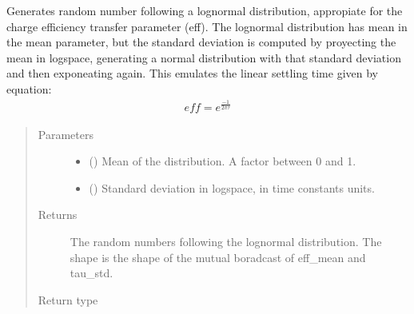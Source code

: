 \documentclass[letterpaper,10pt,english]{sphinxmanual}
\begin{document}

\begin{fulllineitems}
\label{\detokenize{gen:calib.gen.eff_random}}
Generates random number following a lognormal distribution, appropiate for
the charge efficiency transfer parameter (eff). The lognormal distribution
has mean in the mean parameter, but the standard deviation is computed by
proyecting the mean in logspace, generating a normal distribution with that
standard deviation and then exponeating again. This emulates the linear
settling time given by equation:
\begin{equation*}
\begin{split}\mathit{eff} = e^{\frac{-1}{2 \pi \tau}}\end{split}
\end{equation*}\begin{quote}\begin{description}
\item[{Parameters}] \leavevmode\begin{itemize}
\item {} 
 () \textendash{} Mean of the distribution. A factor between 0 and 1.

\item {} 
 () \textendash{} Standard deviation in logspace, in time constants units.

\end{itemize}

\item[{Returns}] \leavevmode
The random numbers following the lognormal distribution. The
shape is the shape of the mutual boradcast of eff\_mean and tau\_std.

\item[{Return type}] \leavevmode
{}

\end{description}\end{quote}

\end{fulllineitems}

\end{document}

